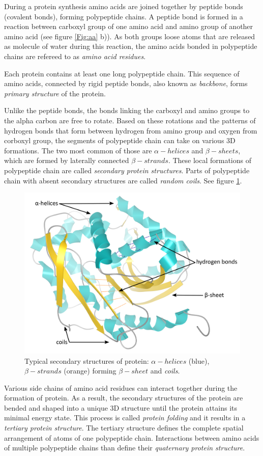 During a protein synthesis amino acids are joined together by peptide bonds (covalent bonds), forming polypeptide chains. A peptide bond is formed in a reaction between carboxyl group of one amino acid and amino group of another amino acid (see figure \ref{Fig:aa} b)). As both groups loose atoms that are released as molecule of water during this reaction, the amino acids bonded in polypeptide chains are refereed to as \textit{amino acid residues}. 

Each protein contains at least one long polypeptide chain. This sequence of amino acids, connected by rigid peptide bonds, also known as \textit{backbone}, forms \textit{primary structure} of the protein.

Unlike the peptide bonds, the bonds linking the carboxyl and amino groups to the alpha carbon are free to rotate. Based on these rotations and the patterns of hydrogen bonds that form between hydrogen from amino group and oxygen from corboxyl group, the segments of polypeptide chain can take on various 3D formations. The two most common of those are $\alpha-helices$ and $\beta-sheets$, which are formed by laterally connected $\beta-strands$. These local formations of polypeptide chain are called \textit{secondary protein structures}. Parts of polypeptide chain with absent secondary structures are called \textit{random coils}. See figure \ref{Fig:secondary}.

\begin{figure}[H]
  \centering
  \includegraphics[width=.6\textwidth]{pictures/secondary.pdf} 
  \caption{Typical secondary structures of protein: $\alpha-helices$ (blue), $\beta-strands$ (orange) forming $\beta-sheet$ and \textit{coils}.}
  \label{Fig:secondary}
\end{figure} 

Various side chains of amino acid residues can interact together during the formation of protein. As a result, the secondary structures of the protein are bended and shaped into a  unique 3D structure until the protein attains its minimal energy state. This process is called \textit{protein folding} and it results in a \textit{tertiary protein structure}. The tertiary structure defines the complete spatial arrangement of atoms of one polypeptide chain. Interactions between amino acids of multiple polypeptide chains than define their \textit{quaternary protein structure}.

